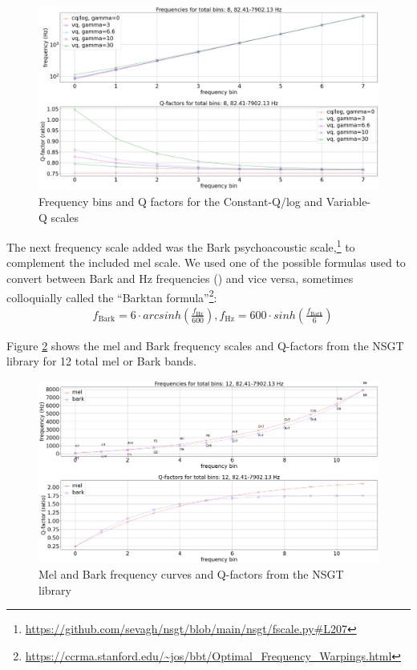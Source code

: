 \documentclass[report.tex]{subfiles}
\begin{document}
\begin{figure}[ht]
	\centering
	\includegraphics[width=\textwidth]{./images-freqscales/vqlog.png}
	\caption{Frequency bins and Q factors for the Constant-Q/log and Variable-Q scales}
	\label{fig:vq}
\end{figure}

The next frequency scale added was the Bark psychoacoustic scale,\footnote{\url{https://github.com/sevagh/nsgt/blob/main/nsgt/fscale.py\#L207}} to complement the included mel scale. We used one of the possible formulas used to convert between Bark and Hz frequencies (\cite{barktan}) and vice versa, sometimes colloquially called the ``Barktan formula''\footnote{\url{https://ccrma.stanford.edu/~jos/bbt/Optimal_Frequency_Warpings.html}}:
\begin{align}
	\nonumber & f_{\text{Bark}} = 6 \cdot arcsinh(\frac{f_{\text{Hz}}}{600}), f_{\text{Hz}} = 600 \cdot sinh(\frac{f_{\text{Bark}}}{6})
\end{align}

Figure \ref{fig:melbarkfsandqs} shows the mel and Bark frequency scales and Q-factors from the NSGT library for 12 total mel or Bark bands.

\begin{figure}[ht]
	\centering
	\includegraphics[width=\textwidth]{./images-freqscales/melbarkpitchesqs.png}
	\caption{Mel and Bark frequency curves and Q-factors from the NSGT library}
	\label{fig:melbarkfsandqs}
\end{figure}
\end{document}

